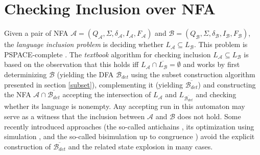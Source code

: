 \chapter{Checking Inclusion over NFA}
\label{chapInclusion}
Given a pair of NFA $\mathcal{A}=(Q_\mathcal{A},\Sigma,\delta_\mathcal{A},I_\mathcal{A},F_\mathcal{A})$ 
and $\mathcal{B}=(Q_\mathcal{B},\Sigma,\delta_\mathcal{B},I_\mathcal{B},F_\mathcal{B})$, 
the \emph{language inclusion problem} is deciding whether $L_\mathcal{A} \subseteq L_\mathcal{B}$.
This problem is PSPACE-complete \cite{cav06}. The \emph{textbook} algorithm for checking inclusion $L_\mathcal{A}\subseteq L_\mathcal{B}$ 
is based on the observation that this holds iff $L_{\mathcal{A}}\cap \overline{L_\mathcal{B}}=\emptyset$ and works by first 
determinizing $\mathcal{B}$ (yielding the DFA 
$\mathcal{B}_{det}$ using the subset construction algorithm presented in section \ref{subset}), 
complementing it (yielding $\overline{\mathcal{B}_{det}}$) and constructing the NFA $\mathcal{A} \cap \overline{\mathcal{B}_{det}}$ 
accepting the intersection of $L_{\mathcal{A}}$ and ${L_{\overline{\mathcal{B}_{det}}}}$ and
checking whether its language is nonempty. Any accepting run in this automaton may serve as a witness that the inclusion between $\mathcal{A}$ 
and $\mathcal{B}$ does not hold.
Some recently introduced approaches (the so-called antichains \cite{cav06}, its optimization using simulation \cite{tacas10}, and the so-called bisimulation up to
congruence \cite{popl13}) avoid the explicit construction of $\overline{\mathcal{B}_{det}}$ and the related state explosion in many cases.

